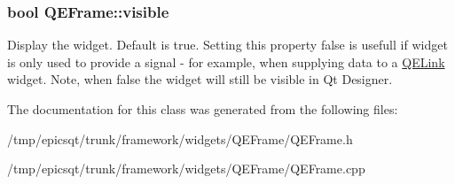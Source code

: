 \hypertarget{classQEFrame_a42b6f201a511f9a3b87e2474c16c0f5b}{
\subsubsection[{visible}]{\setlength{\rightskip}{0pt plus 5cm}bool QEFrame::visible}}
\label{classQEFrame_a42b6f201a511f9a3b87e2474c16c0f5b}
Display the widget. Default is true. Setting this property false is usefull if widget is only used to provide a signal -\/ for example, when supplying data to a \hyperlink{classQELink}{QELink} widget. Note, when false the widget will still be visible in Qt Designer. 

The documentation for this class was generated from the following files:\begin{DoxyCompactItemize}
\item 
/tmp/epicsqt/trunk/framework/widgets/QEFrame/QEFrame.h\item 
/tmp/epicsqt/trunk/framework/widgets/QEFrame/QEFrame.cpp\end{DoxyCompactItemize}
